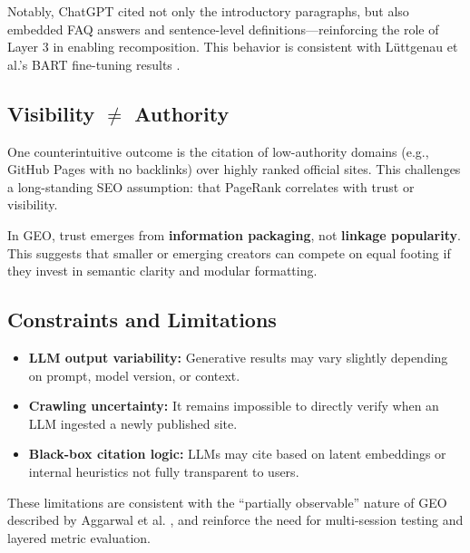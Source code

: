Notably, ChatGPT cited not only the introductory paragraphs, but also embedded FAQ answers and sentence-level definitions---reinforcing the role of Layer 3 in enabling recomposition. This behavior is consistent with Lüttgenau et al.’s BART fine-tuning results \cite{luttgenau2025beyondseo}.

\subsection{Visibility \texorpdfstring{$\neq$}{≠} Authority}


One counterintuitive outcome is the citation of low-authority domains (e.g., GitHub Pages with no backlinks) over highly ranked official sites. This challenges a long-standing SEO assumption: that PageRank correlates with trust or visibility.

In GEO, trust emerges from \textbf{information packaging}, not \textbf{linkage popularity}. This suggests that smaller or emerging creators can compete on equal footing if they invest in semantic clarity and modular formatting.

\subsection{Constraints and Limitations}

\begin{itemize}
  \item \textbf{LLM output variability:} Generative results may vary slightly depending on prompt, model version, or context.
  \item \textbf{Crawling uncertainty:} It remains impossible to directly verify when an LLM ingested a newly published site.
  \item \textbf{Black-box citation logic:} LLMs may cite based on latent embeddings or internal heuristics not fully transparent to users.
\end{itemize}

These limitations are consistent with the “partially observable” nature of GEO described by Aggarwal et al. \cite{aggarwal2024geo}, and reinforce the need for multi-session testing and layered metric evaluation.
